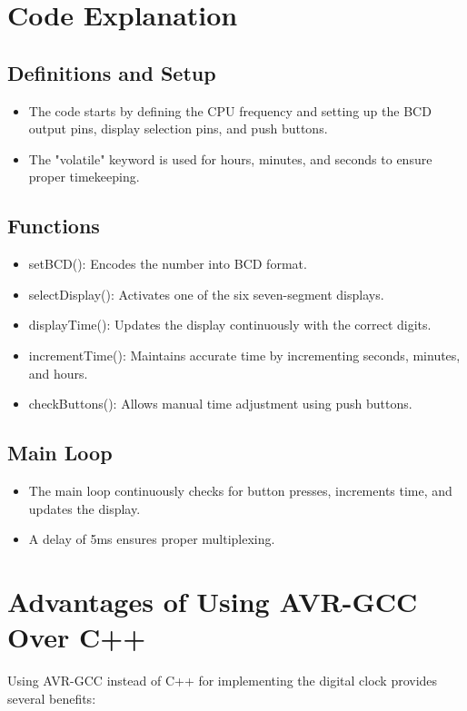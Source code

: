 \documentclass[a4paper,12pt]{article}
\theoremstyle{remark}
\begin{document}
\section{Code Explanation}

\subsection{Definitions and Setup}
\begin{itemize}
    \item The code starts by defining the CPU frequency and setting up the BCD output pins, display selection pins, and push buttons.
    \item The "volatile" keyword is used for hours, minutes, and seconds to ensure proper timekeeping.
\end{itemize}


\subsection{Functions}
\begin{itemize}
    \item setBCD(): Encodes the number into BCD format.
    \item selectDisplay(): Activates one of the six seven-segment displays.
    \item displayTime(): Updates the display continuously with the correct digits.
    \item incrementTime(): Maintains accurate time by incrementing seconds, minutes, and hours.
    \item checkButtons(): Allows manual time adjustment using push buttons.
\end{itemize}

\subsection{Main Loop}
\begin{itemize}
    \item The main loop continuously checks for button presses, increments time, and updates the display.
    \item A delay of 5ms ensures proper multiplexing.
\end{itemize}


\section{Advantages of Using AVR-GCC Over C++}
Using AVR-GCC instead of C++ for implementing the digital clock provides several benefits:
\end{document}
